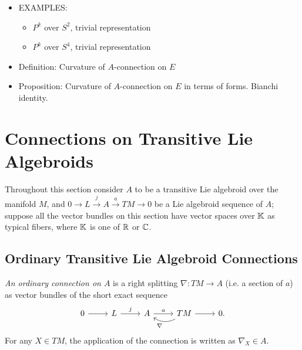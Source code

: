 {\begin{itemize}
\begin{itemize}
        \item EXAMPLES:
        
            \begin{itemize}
                
            \item $P^k$ over $S^2$, trivial representation
            
            \item $P^k$ over $S^4$, trivial representation
            
            \end{itemize}
        
        \item Definition: Curvature of $A$-connection on $E$
        
        \item Proposition: Curvature of $A$-connection on $E$ in terms of forms. Bianchi identity.
            
        \end{itemize}
    
    \end{itemize}
}

\section{Connections on Transitive Lie Algebroids}
Throughout this section consider $A$ to be a transitive Lie algebroid over the manifold $M$, and $0 \to L \xrightarrow{j} A \xrightarrow{a} TM \to 0$ be a Lie algebroid sequence of $A$; suppose all the vector bundles on this section have vector spaces over $\mathbb{K}$ as typical fibers, where $\mathbb{K}$ is one of $\mathbb{R}$ or $\mathbb{C}$.

\subsection{Ordinary Transitive Lie Algebroid Connections}



\begin{definition}
\emph{An ordinary connection on $A$} is a right splitting $\nabla: TM \to A$ (i.e. a section of $a$) as vector bundles of the short exact sequence
\begin{equation}\label{equationDefinitionConnectionRightSplittingNablaSectionAnchorShortExactSequence}
    \begin{tikzcd}
    0 \arrow{r} & L \arrow{r}{j} & A \arrow{r}{a} & TM \arrow{r} \arrow[bend left]{l}{\nabla} & 0.
    \end{tikzcd}
\end{equation}
For any $X \in TM$, the application of the connection is written as $\nabla_X \in A$.
\end{definition}

